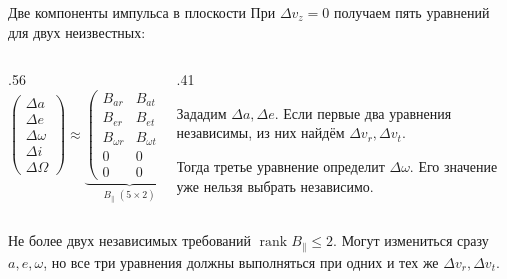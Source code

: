 \documentclass[11pt,aspectratio=169,t]{beamer}
\begin{document}
\begin{frame}{Две компоненты импульса в плоскости}
\setlength{\abovedisplayskip}{3pt}
\setlength{\belowdisplayskip}{3pt}
При $\Delta v_z=0$ получаем пять уравнений для двух неизвестных:
\begin{columns}[T,onlytextwidth]
\begin{column}{.56\textwidth}
\[
\begin{pmatrix}
\Delta a\\ \Delta e\\ \Delta\omega\\ \Delta i\\ \Delta\Omega
\end{pmatrix}
\approx
\underbrace{\begin{pmatrix}
B_{ar}&B_{at}\\
B_{er}&B_{et}\\
B_{\omega r}&B_{\omega t}\\
0&0\\
0&0
\end{pmatrix}}_{B_{\parallel}\; (5\times2)}
\begin{pmatrix}\Delta v_r\\ \Delta v_t\end{pmatrix}.
\]
\end{column}
\begin{column}{.41\textwidth}
\smallskip\raggedright
Зададим $\Delta a,\Delta e$. Если первые два уравнения независимы,
из них найдём $\Delta v_r,\Delta v_t$.
\par\smallskip
Тогда третье уравнение определит $\Delta\omega$.
Его значение уже нельзя выбрать независимо.
\end{column}
\end{columns}
\begin{block}{Не более двух независимых требований}
\justifying
$\operatorname{rank}B_{\parallel}\leq2$. Могут измениться сразу $a,e,\omega$,
но все три уравнения должны выполняться при одних и тех же $\Delta v_r,\Delta v_t$.
\end{block}
\end{frame}
\end{document}
